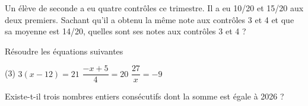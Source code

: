 \documentclass[10pt,a4paper]{article}
\begin{document}
\begin{exo}[][appro]
    Un élève de seconde a eu quatre contrôles ce trimestre. Il a eu 10/20 et 15/20 aux deux premiers. Sachant qu'il a obtenu la même note aux contrôles 3 et 4 et que sa moyenne est 14/20, quelles sont ses notes aux  contrôles 3 et 4 ?
\end{exo}

\begin{exo}[][appro]
Résoudre les équations suivantes \begin{tasks}(3)
    \task \(3(x-12)=21\)
    \task \(\dfrac{-x+5}{4}=20\)
    \task \(\dfrac{27}{x}=-9\)
\end{tasks}
\end{exo}

\begin{exo}[][avance]

Existe-t-il trois nombres entiers consécutifs dont la somme est égale à 2026 ?
\end{exo}
\end{document}
